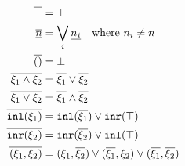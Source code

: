 \begin{figure}
~~
\begin{subequations}
\begin{align}
  \cdual{\ctruth} &= \cfalsity \\
  \cdual{\cnum{n}} &= \bigvee_{i} \cnum{n_i} \quad \text{where $n_i \neq n$}\\
  \cdual{\cunit} &= \cfalsity \\
  \cdual{\cand{\xi_1}{\xi_2}} &= \cor{\cdual{\xi_1}}{\cdual{\xi_2}} \\
  \cdual{\cor{\xi_1}{\xi_2}} &= \cand{\cdual{\xi_1}}{\cdual{\xi_2}} \\
  \cdual{\cinl{\xi_1}} &= \cor{ \cinl{\cdual{\xi_1}} }{ \cinr{\ctruth} } \\
  \cdual{\cinr{\xi_2}} &= \cor{ \cinr{\cdual{\xi_2}} }{ \cinl{\ctruth} } \\
  \cdual{\cpair{\xi_1}{\xi_2}} &=
  \cor{ \cor{ 
    \cpair{\xi_1}{\cdual{\xi_2}}
  }{
    \cpair{\cdual{\xi_1}}{\xi_2}
  }}{
    \cpair{\cdual{\xi_1}}{\cdual{\xi_2}}
  }
\end{align}
\end{subequations}
\end{figure}


